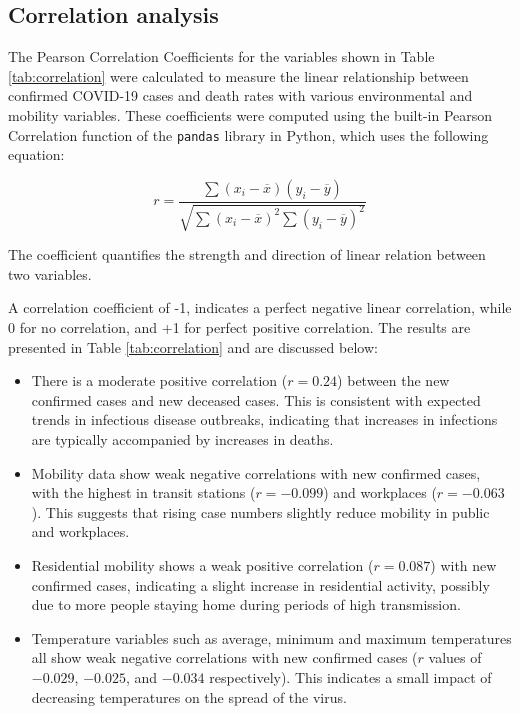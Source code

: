 \documentclass[sigconf,screen,nonacm]{acmart}
\begin{document}
\noindent
\subsection{Correlation analysis} \label{Sec:Corr}



The Pearson Correlation Coefficients for the variables shown in Table \ref{tab:correlation} were calculated to measure the linear relationship between confirmed COVID-19 cases and death rates with various environmental and mobility variables. These coefficients were computed using the built-in Pearson Correlation function of the \texttt{pandas} library in Python, which uses the following equation:

\begin{equation}
r = \frac{\sum (x_i - \overline{x})(y_i - \overline{y})}{\sqrt{\sum (x_i - \overline{x})^2 \sum (y_i - \overline{y})^2}}
\end{equation}

The coefficient quantifies the strength and direction of linear relation between two variables.

A correlation coefficient of -1, indicates a perfect negative linear correlation, while 0 for no correlation, and +1 for perfect positive correlation. The results are presented in Table \ref{tab:correlation} and are discussed below:

\begin{itemize}
    \item There is a moderate positive correlation ($r=0.24$) between the new confirmed cases and new deceased cases. This is consistent with expected trends in infectious disease outbreaks, indicating that increases in infections are typically accompanied by increases in deaths.
    \item Mobility data show weak negative correlations with new confirmed cases, with the highest in transit stations ($r=-0.099$) and workplaces ($r=-0.063$). This suggests that rising case numbers slightly reduce mobility in public and workplaces.
    \item Residential mobility shows a weak positive correlation ($r=0.087$) with new confirmed cases, indicating a slight increase in residential activity, possibly due to more people staying home during periods of high transmission.
    \item Temperature variables such as average, minimum and maximum temperatures all show weak negative correlations with new confirmed cases ($r$ values of $-0.029$, $-0.025$, and $-0.034$ respectively). This indicates a small impact of decreasing temperatures on the spread of the virus.
\end{itemize}
\end{document}
